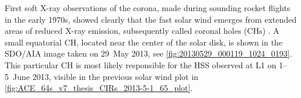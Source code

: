First soft X-ray observations of the corona, made during sounding rocket flights in the early 1970s, showed clearly that the fast solar wind emerges from extended areas of reduced X-ray emission, subsequently called coronal holes (CHs) \citep{Krieger1973,Hundhausen1977}. A small equatorial CH, located near the center of the solar disk, is shown in the SDO/AIA image taken on 29~May 2013, see \autoref{fig:20130529_000119_1024_0193}. This particular CH is most likely responsible for the HSS observed at L1 on 1--5~June 2013, visible in the previous solar wind plot in \autoref{fig:ACE_64s_v7_thesis_CIRs_2013-5-1_65_plot}.
\begin{figure}[htb]
	\begin{floatrow}
\end{floatrow}
\end{figure}
